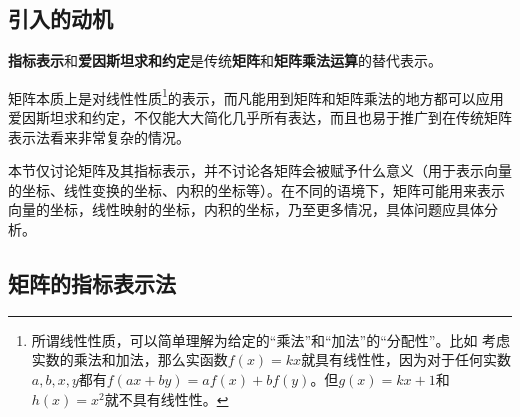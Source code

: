
\begin{issues}
\end{issues}





\subsection{引入的动机}


\textbf{指标表示}和\textbf{爱因斯坦求和约定}是传统\textbf{矩阵}和\textbf{矩阵乘法运算}的替代表示。

矩阵本质上是对线性性质\footnote{所谓线性性质，可以简单理解为给定的“乘法”和“加法”的“分配性”。比如
考虑实数的乘法和加法，那么实函数$f(x)=kx$就具有线性性，因为对于任何实数$a, b, x, y$都有$f(ax+by)=af(x)+bf(y)$。但$g(x)=kx+1$和$h(x)=x^2$就不具有线性性。}的表示，而凡能用到矩阵和矩阵乘法的地方都可以应用爱因斯坦求和约定，不仅能大大简化几乎所有表达，而且也易于推广到在传统矩阵表示法看来非常复杂的情况。

本节仅讨论矩阵及其指标表示，并不讨论各矩阵会被赋予什么意义（用于表示向量的坐标、线性变换的坐标、内积的坐标等）。在不同的语境下，矩阵可能用来表示向量的坐标，线性映射的坐标，内积的坐标，乃至更多情况，具体问题应具体分析。





\subsection{矩阵的指标表示法}


